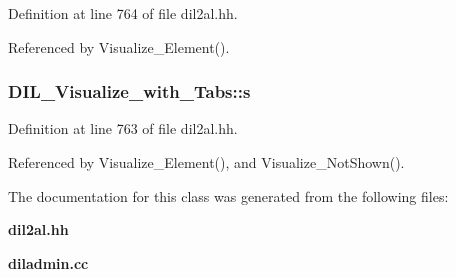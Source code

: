 Definition at line 764 of file dil2al.hh.

Referenced by Visualize\_\-Element().
\subsubsection{ DIL\_\-Visualize\_\-with\_\-Tabs::s\hspace{0.3cm}{\tt  [protected]}}\label{classDIL__Visualize__with__Tabs_n0}




Definition at line 763 of file dil2al.hh.

Referenced by Visualize\_\-Element(), and Visualize\_\-Not\-Shown().

The documentation for this class was generated from the following files:\begin{CompactItemize}
\item 
{\bf dil2al.hh}\item 
{\bf diladmin.cc}\end{CompactItemize}
